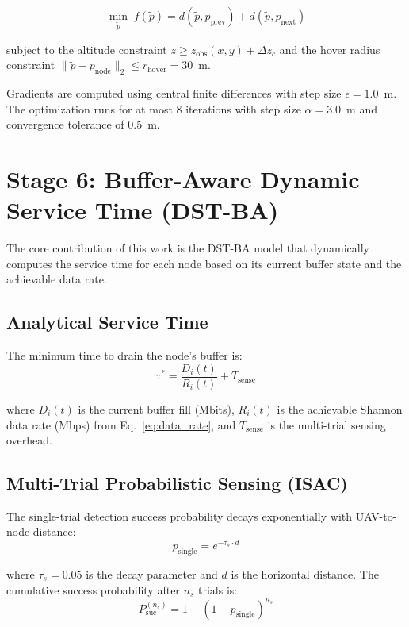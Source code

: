 \documentclass[12pt, a4paper, oneside]{report}
\begin{document}
\begin{equation}
\min_{\tilde{p}} \; f(\tilde{p}) = d(\tilde{p}, p_{\text{prev}}) + d(\tilde{p}, p_{\text{next}})
\label{eq:sca_obj}
\end{equation}

subject to the altitude constraint $z \geq z_{\text{obs}}(x, y) + \Delta z_c$ and the hover radius constraint $\|\tilde{p} - p_{\text{node}}\|_2 \leq r_{\text{hover}} = 30$~m.

Gradients are computed using central finite differences with step size $\epsilon = 1.0$~m. The optimization runs for at most 8 iterations with step size $\alpha = 3.0$~m and convergence tolerance of 0.5~m.

\section{Stage 6: Buffer-Aware Dynamic Service Time (DST-BA)}
\label{sec:dst_ba}

The core contribution of this work is the DST-BA model that dynamically computes the service time for each node based on its current buffer state and the achievable data rate.

\subsection{Analytical Service Time}

The minimum time to drain the node's buffer is:
\begin{equation}
\tau^* = \frac{D_i(t)}{R_i(t)} + T_{\text{sense}}
\label{eq:service_time}
\end{equation}

where $D_i(t)$ is the current buffer fill (Mbits), $R_i(t)$ is the achievable Shannon data rate (Mbps) from Eq.~\eqref{eq:data_rate}, and $T_{\text{sense}}$ is the multi-trial sensing overhead.

\subsection{Multi-Trial Probabilistic Sensing (ISAC)}

The single-trial detection success probability decays exponentially with UAV-to-node distance:
\begin{equation}
p_{\text{single}} = e^{-\tau_s \cdot d}
\label{eq:single_trial}
\end{equation}

where $\tau_s = 0.05$ is the decay parameter and $d$ is the horizontal distance. The cumulative success probability after $n_s$ trials is:
\begin{equation}
P_{\text{suc}}^{(n_s)} = 1 - (1 - p_{\text{single}})^{n_s}
\label{eq:cumulative}
\end{equation}
\end{document}
